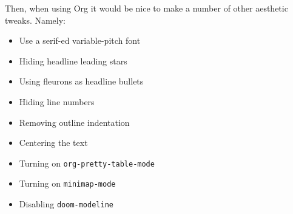 \documentclass{scrartcl}
\begin{document}
Then, when using Org it would be nice to make a number of other aesthetic
tweaks. Namely:
\begin{itemize}
\item Use a serif-ed variable-pitch font
\item Hiding headline leading stars
\item Using fleurons as headline bullets
\item Hiding line numbers
\item Removing outline indentation
\item Centering the text
\item Turning on \texttt{org-pretty-table-mode}
\item Turning on \texttt{minimap-mode}
\item Disabling \texttt{doom-modeline}
\end{itemize}
\end{document}
